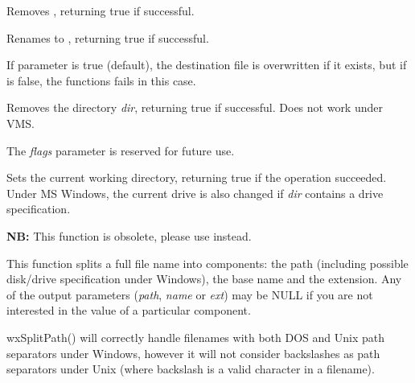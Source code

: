 \label{wxremovefile}


Removes , returning true if successful.


\label{wxrenamefile}


Renames  to , returning true if successful.

If  parameter is true (default), the destination file is
overwritten if it exists, but if  is false, the functions fails
in this case.


\label{wxrmdir}


Removes the directory {\it dir}, returning true if successful. Does not work under VMS.

The {\it flags} parameter is reserved for future use.


\label{wxsetworkingdirectory}


Sets the current working directory, returning true if the operation succeeded.
Under MS Windows, the current drive is also changed if {\it dir} contains a drive specification.


\label{wxsplitfunction}


{\bf NB:} This function is obsolete, please use
 instead.

This function splits a full file name into components: the path (including possible disk/drive
specification under Windows), the base name and the extension. Any of the output parameters
({\it path}, {\it name} or {\it ext}) may be NULL if you are not interested in the value of
a particular component.

wxSplitPath() will correctly handle filenames with both DOS and Unix path separators under
Windows, however it will not consider backslashes as path separators under Unix (where backslash
is a valid character in a filename).

